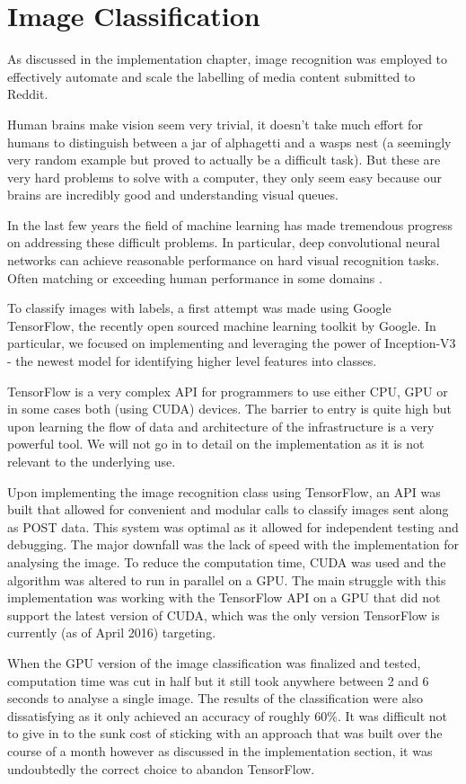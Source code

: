 \documentclass[msc,oneside]{ubcthesis}%
\begin{document}
\section{Image Classification}
As discussed in the implementation chapter, image recognition was employed to effectively automate and scale the labelling of media content submitted to Reddit.
\par
Human brains make vision seem very trivial, it doesn't take much effort for humans to distinguish between a jar of alphagetti and a wasps nest (a seemingly very random example but proved to actually be a difficult task). But these are very hard problems to solve with a computer, they only seem easy because our brains are incredibly good and understanding visual queues. 
\par
In the last few years the field of machine learning has made tremendous progress on addressing these difficult problems. In particular, deep convolutional neural networks can achieve reasonable performance on hard visual recognition tasks. Often matching or exceeding human performance in some domains \citep{TensorFlow}.
\par
To classify images with labels, a first attempt was made using Google TensorFlow, the recently open sourced machine learning toolkit by Google. In particular, we focused on implementing and leveraging the power of Inception-V3 \citep{DBLP:journals/corr/SzegedyVISW15} - the newest model for identifying higher level features into classes.
\par
TensorFlow is a very complex API for programmers to use either CPU, GPU or in some cases both (using CUDA) devices. The barrier to entry is quite high but upon learning the flow of data and architecture of the infrastructure is a very powerful tool. We will not go in to detail on the implementation as it is not relevant to the underlying use.
\par
Upon implementing the image recognition class using TensorFlow, an API was built that allowed for convenient and modular calls to classify images sent along as POST data. This system was optimal as it allowed for independent testing and debugging. The major downfall was the lack of speed with the implementation for analysing the image. To reduce the computation time, CUDA was used and the algorithm was altered to run in parallel on a GPU. The main struggle with this implementation was working with the TensorFlow API on a GPU that did not support the latest version of CUDA, which was the only version TensorFlow is currently (as of April 2016) targeting. 
\par
When the GPU version of the image classification was finalized and tested, computation time was cut in half but it still took anywhere between 2 and 6 seconds to analyse a single image. The results of the classification were also dissatisfying as it only achieved an accuracy of roughly 60\%. It was difficult not to give in to the sunk cost of sticking with an approach that was built over the course of a month however as discussed in the implementation section, it was undoubtedly the correct choice to abandon TensorFlow.
\end{document}
